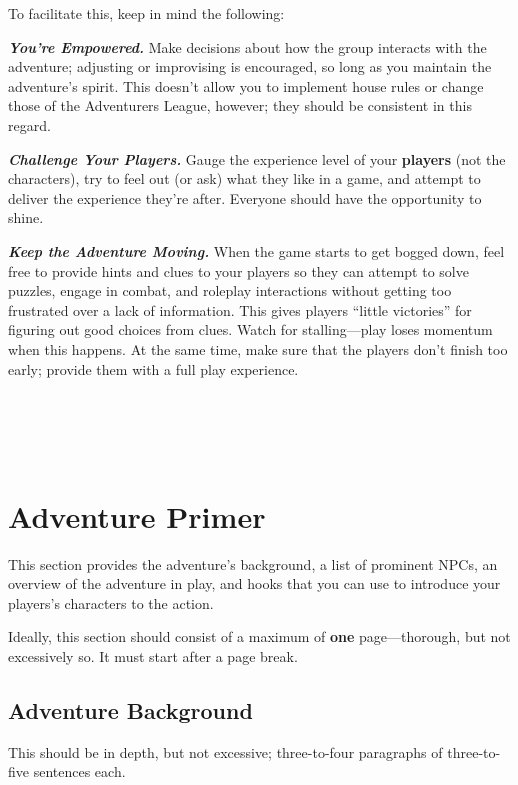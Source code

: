 To facilitate this, keep in mind the following:

\emph{\textbf{You're Empowered.}} Make decisions about how the group
interacts with the adventure; adjusting or improvising is encouraged, so
long as you maintain the adventure's spirit. This doesn't allow you to
implement house rules or change those of the Adventurers League,
however; they should be consistent in this regard.

\emph{\textbf{Challenge Your Players.}} Gauge the experience level of
your \textbf{players} (not the characters), try to feel out (or ask)
what they like in a game, and attempt to deliver the experience they're
after. Everyone should have the opportunity to shine.

\emph{\textbf{Keep the Adventure Moving.}} When the game starts to get
bogged down, feel free to provide hints and clues to your players so
they can attempt to solve puzzles, engage in combat, and roleplay
interactions without getting too frustrated over a lack of information.
This gives players ``little victories'' for figuring out good choices
from clues. Watch for stalling---play loses momentum when this happens.
At the same time, make sure that the players don't finish too early;
provide them with a full play experience.

\section{\texorpdfstring{\\
}{ }}\label{section-2}

\section{Adventure Primer}\label{adventure-primer}

This section provides the adventure's background, a list of prominent
NPCs, an overview of the adventure in play, and hooks that you can use
to introduce your players's characters to the action.

Ideally, this section should consist of a maximum of \textbf{one}
page---thorough, but not excessively so. It must start after a page
break.

\subsection{Adventure Background}\label{adventure-background}

This should be in depth, but not excessive; three-to-four paragraphs of
three-to-five sentences each.

